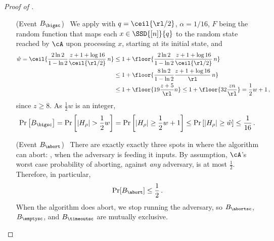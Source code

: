 \begin{itemize}
\begin{itemize}
\begin{proof}[Proof of ]
\begin{itemize}
\begin{itemize}[wide, font=\bfseries]
    If $\Pr[B_{\unsafesc}] > 1/(16)$, we then have
    $\Mstk(n,\rl,\frac{1}{2},z) \ge \rl/(2^7 n)$, which implies
    \cref{eq:mif-rt-lb-step-err} leaving nothing more to prove. Therefore, for
    the rest of this proof we will consider the case in which
    \begin{align}
      \Pr[B_{\unsafesc}] \le \frac{1}{16} \,.
      \label{eq:b-unsafe-bound}
    \end{align}

  \item[(Event $B_{\bigsc}$)~]
    We apply  with $q = \ceil{\rl/2}$, $\alpha =
    1/16$, $F$ being the random function that maps each $x \in
    \SSD{[n]}{q}$ to the random state reached by $\cA$ upon processing $x$,
    starting at its initial state, and
    \begin{align*}
      \hat{w} = \ceil{\frac{2\ln2}{1-\ln2} \frac{z+1+\log 16}{\ceil{\rl/2}}\, n} 
        &\le 1 + \floor{\frac{2\ln2}{1-\ln2} \frac{z+1+\log 16}{\ceil{\rl/2}}\, n} \\
        &\le 1 + \floor{\frac{8 \ln 2}{1 - \ln 2} \frac{z + 1 + \log 16}{\rl}\, n} \\
        &\le 1 + \floor{19 \frac{z + 5}{\rl} n} 
          \le 1 + \floor{32 \frac{z n}{\rl}} = \frac{1}{2} w + 1 \,,
    \end{align*}
    since $z \ge 8$. As $\frac{1}{2} w$ is an integer,
    \begin{align}
      \Pr\left[B_{\bigsc}\right]
      = \Pr\left[|H_\rho| > \frac{1}{2} w\right] 
      = \Pr\left[|H_\rho| \ge \frac{1}{2} w + 1\right] 
      \le \Pr\left[|H_\rho| \ge \hat{w}\right] 
      \le \frac{1}{16} \,.
      \label{eq:b-big-bound}
    \end{align}
    
  \item[(Event $B_{\abort}$)~] 
    There are exactly exactly three spots in 
    where the algorithm can abort:
    , when the
    adversary is feeding it inputs.  By assumption, $\cA$'s worst case
    probability of aborting, against {\em any} adversary, is at most
    $\frac12$. Therefore, in particular,
    \begin{align}
      \Pr[B_{\abort}] \le \frac{1}{2} \,.
      \label{eq:b-abort-bound}
    \end{align}
    When the algorithm does abort, we stop running the adversary, so
    $B_{\abortsc}$, $B_{\emptysc}$, and $B_{\timeoutsc}$ are mutually exclusive.
    

\end{itemize}
\end{itemize}
\end{proof}
\end{itemize}
\end{itemize}
